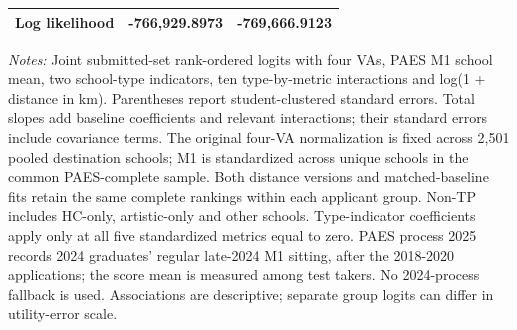 \begin{table}[!htbp]
{\begin{tabular}{lcc}
Log likelihood & -766,929.8973 & -769,666.9123 \\
\bottomrule
\end{tabular}
}
\par\smallskip
\begin{minipage}{0.98\linewidth}\footnotesize
\textit{Notes:} Joint submitted-set rank-ordered logits with four VAs, PAES M1 school mean, two school-type indicators, ten type-by-metric interactions and log(1 + distance in km). Parentheses report student-clustered standard errors. Total slopes add baseline coefficients and relevant interactions; their standard errors include covariance terms. The original four-VA normalization is fixed across 2,501 pooled destination schools; M1 is standardized across unique schools in the common PAES-complete sample. Both distance versions and matched-baseline fits retain the same complete rankings within each applicant group. Non-TP includes HC-only, artistic-only and other schools. Type-indicator coefficients apply only at all five standardized metrics equal to zero. PAES process 2025 records 2024 graduates' regular late-2024 M1 sitting, after the 2018-2020 applications; the score mean is measured among test takers. No 2024-process fallback is used. Associations are descriptive; separate group logits can differ in utility-error scale.
\end{minipage}
\end{table}
